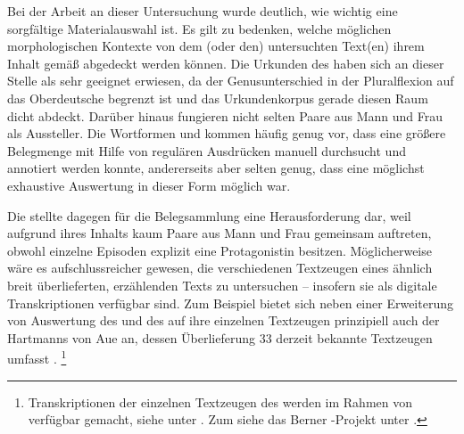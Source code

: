 Bei der Arbeit an dieser Untersuchung wurde deutlich, wie wichtig eine
sorgfältige Material\-auswahl ist. Es gilt zu bedenken, welche möglichen
morphologischen Kontexte von dem (oder den) untersuchten Text(en) ihrem Inhalt
gemäß abgedeckt werden können. Die Urkunden des \CAO{} haben sich an dieser
Stelle als sehr geeignet erwiesen, da der Genusunterschied in der Pluralflexion
auf das Oberdeutsche begrenzt ist und das Urkundenkorpus gerade
diesen Raum dicht abdeckt. Darüber hinaus fungieren nicht
selten Paare aus Mann und Frau als Aussteller. Die Wortformen  und
 kommen häufig genug vor, dass eine größere Belegmenge mit Hilfe
von regulären Ausdrücken manuell durchsucht und annotiert werden konnte,
andererseits aber selten genug, dass eine möglichst exhaustive Auswertung in
dieser Form möglich war.

Die \KC{} stellte dagegen für die Belegsammlung eine Herausforderung
dar, weil aufgrund ihres Inhalts kaum Paare aus Mann und Frau gemeinsam
auftreten, obwohl einzelne Episoden explizit eine Protagonistin besitzen.
Möglicherweise wäre es aufschlussreicher gewesen, die verschiedenen Textzeugen
eines ähnlich breit überlieferten, erzählenden Texts zu untersuchen -- insofern
sie als digitale Transkriptionen verfügbar sind. Zum Beispiel bietet sich neben
einer Erweiterung von  Auswertung des
 und des  auf ihre einzelnen Textzeugen prinzipiell
auch der  Hartmanns von Aue an, dessen Überlieferung 33 derzeit
bekannte Textzeugen umfasst \autocites[vgl.][s.\,v.~\textit{Hartmann von Aue:
}]{hsc}.%
%
	\footnote{Transkriptionen der einzelnen Textzeugen des  werden
		im Rahmen von  verfügbar gemacht, siehe unter
		. Zum  siehe das Berner
		-Projekt unter .%
	}


